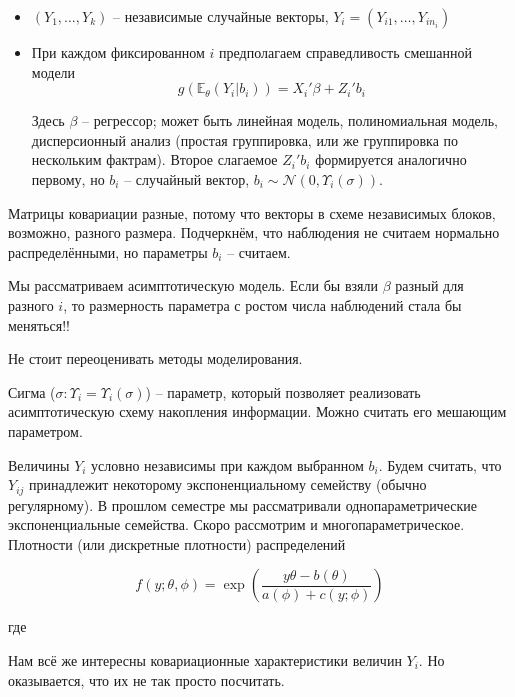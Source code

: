 \documentclass[main.tex]{subfiles}
\begin{document}
\begin{itemize}[noitemsep]
	\item $ (Y_1, \dots, Y_k) $ -- независимые случайные векторы, $ Y_i = (Y_{i1}, \dots, Y_{in_i}) $
	\item При каждом фиксированном $ i $ предполагаем справедливость смешанной модели
	\[ g(\mathds E_{\theta} (Y_i | b_i)) = X_i' \beta + Z_i' b_i \]
	
	Здесь $ \beta $ -- регрессор; может быть линейная модель, полиномиальная модель, дисперсионный анализ (простая группировка, или же группировка по нескольким фактрам).
	Второе слагаемое $ Z_i' b_i $ формируется аналогично первому, но $ b_i $ -- случайный вектор,  $ b_i \sim \mathcal N (0, \Upsilon_i(\sigma)) $.
\end{itemize}

Матрицы ковариации разные, потому что векторы в схеме независимых блоков, возможно, разного размера.
Подчеркнём, что наблюдения не считаем нормально распределёнными, но параметры $ b_i $ -- считаем.

\begin{leftbar}
	Мы рассматриваем асимптотическую модель.
	Если бы взяли $ \beta $ разный для разного $ i $, то размерность параметра с ростом числа наблюдений стала бы меняться!!
\end{leftbar}

\begin{leftbar}
	Не стоит переоценивать методы моделирования. %
\end{leftbar}

Сигма ($ \sigma: \Upsilon_i = \Upsilon_i(\sigma) $) -- параметр, который позволяет реализовать асимптотическую схему накопления информации.
Можно считать его мешающим параметром.

Величины $ Y_i $ условно независимы при каждом выбранном $ b_i $.
Будем считать, что $ Y_{ij} $ принадлежит некоторому экспоненциальному семейству (обычно регулярному).
В прошлом семестре мы рассматривали однопараметрические экспоненциальные семейства.
Скоро рассмотрим и многопараметрическое. \\

Плотности (или дискретные плотности) распределений

\[ f(y; \theta, \phi) = \exp \left( \frac{y\theta - b(\theta)}{a(\phi)+c(y;\phi)} \right) \]

где

Нам всё же интересны ковариационные характеристики величин $ Y_i $.
Но оказывается, что их не так просто посчитать.
\end{document}
